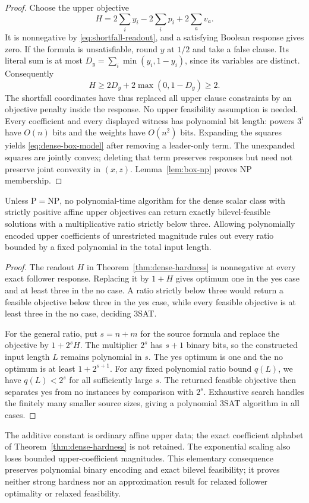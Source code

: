 \begin{proof}
Choose the upper objective
\[
 H=2\sum_i y_i-2\sum_i p_i+2\sum_a v_a.
\]
It is nonnegative by \eqref{eq:shortfall-readout}, and a satisfying Boolean
response gives zero. If the formula is unsatisfiable, round \(y\) at \(1/2\)
and take a false clause. Its literal sum is at most
\(D_y=\sum_i\min(y_i,1-y_i)\), since its variables are distinct. Consequently
\[
 H\ge 2D_y+2\max(0,1-D_y)\ge2.
\]
The shortfall coordinates have thus replaced all upper clause constraints by
an objective penalty inside the response. No upper feasibility assumption is
needed. Every coefficient and every displayed witness has polynomial bit
length: powers \(3^i\) have \(O(n)\) bits and the weights have \(O(n^2)\) bits.
Expanding the squares yields \eqref{eq:dense-box-model} after removing a
leader-only term. The unexpanded squares are jointly convex; deleting that
term preserves responses but need not preserve joint convexity in \((x,z)\).
Lemma~\ref{lem:box-np} proves NP membership.
\end{proof}

\begin{corollary}
\label{cor:dense-multiplicative}
Unless \(\mathrm P=\mathrm{NP}\), no polynomial-time algorithm for the
dense scalar class with strictly positive affine upper objectives can return
exactly bilevel-feasible solutions with a multiplicative ratio strictly below
three. Allowing polynomially encoded upper coefficients of unrestricted
magnitude rules out every ratio bounded by a fixed polynomial in the total
input length.
\end{corollary}
\begin{proof}
The readout \(H\) in Theorem~\ref{thm:dense-hardness} is nonnegative at every
exact follower response. Replacing it by \(1+H\) gives optimum one in the
yes case and at least three in the no case. A ratio strictly below three
would return a feasible objective below three in the yes case, while every
feasible objective is at least three in the no case, deciding 3SAT.

For the general ratio, put \(s=n+m\) for the source formula and replace
the objective by \(1+2^sH\). The multiplier \(2^s\) has \(s+1\) binary
bits, so the constructed input length \(L\) remains polynomial in \(s\).
The yes optimum is one and the no optimum is at least \(1+2^{s+1}\).
For any fixed polynomial ratio bound \(q(L)\), we have \(q(L)<2^s\)
for all sufficiently large \(s\). The returned feasible objective then
separates yes from no instances by comparison with \(2^s\). Exhaustive
search handles the finitely many smaller source sizes, giving a polynomial
3SAT algorithm in all cases.
\end{proof}
The additive constant is ordinary affine upper data; the exact coefficient
alphabet of Theorem~\ref{thm:dense-hardness} is not retained. The exponential
scaling also loses bounded upper-coefficient magnitudes. This elementary
consequence preserves polynomial binary encoding and exact bilevel feasibility;
it proves neither strong hardness nor an approximation result for relaxed
follower optimality or relaxed feasibility.

